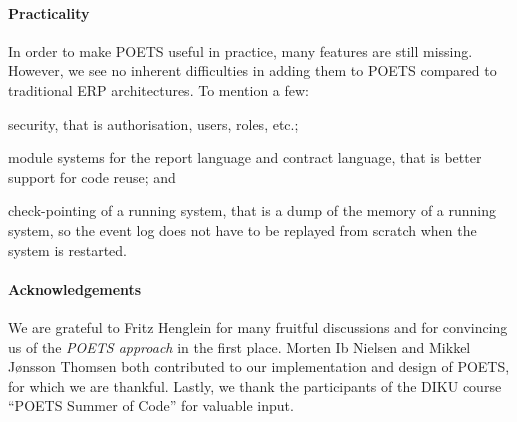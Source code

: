 \paragraph{Practicality}
In order to make POETS useful in practice, many features are still 
missing. However, we see no inherent difficulties in adding them to
POETS compared to traditional ERP architectures. To mention a few:
\begin{inparaenum}[(i)]
\item security, that is authorisation, users, roles, etc.;
\item module systems for the report language and contract language,
  that is better support for code reuse; and
\item check-pointing of a running system, that is a dump of the memory
  of a running system, so the event log does not have to be replayed
  from scratch when the system is restarted.
\end{inparaenum}

\paragraph{Acknowledgements} We are grateful to Fritz Henglein for
many fruitful discussions and for convincing us of the \emph{POETS
  approach} in the first place. Morten Ib Nielsen and Mikkel
J\o{}nsson Thomsen both contributed to our implementation and design
of POETS, for which we are thankful. Lastly, we thank the participants
of the DIKU course ``POETS Summer of Code'' for valuable input.

